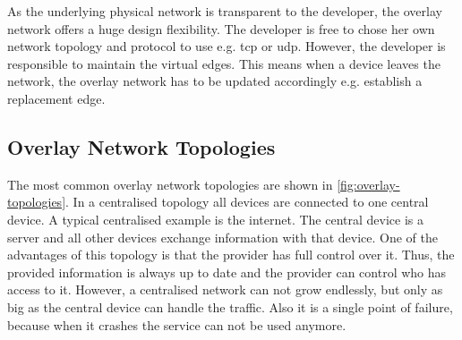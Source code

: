 As the underlying physical network is transparent to the developer, the overlay network offers a huge design flexibility. The developer is free to chose her own network topology and protocol to use e.g. \gls{tcp} or \gls{udp}. However, the developer is responsible to maintain the virtual edges. This means when a device leaves the network, the overlay network has to be updated accordingly e.g. establish a replacement edge.

\subsection{Overlay Network Topologies}
The most common overlay network topologies are shown in \cref{fig:overlay-topologies}. In a centralised topology all devices are connected to one central device. A typical centralised example is the internet. The central device is a server and all other devices exchange information with that device. One of the advantages of this topology is that the provider has full control over it. Thus, the provided information is always up to date and the provider can control who has access to it. However, a centralised network can not grow endlessly, but only as big as the central device can handle the traffic. Also it is a single point of failure, because when it crashes the service can not be used anymore.

